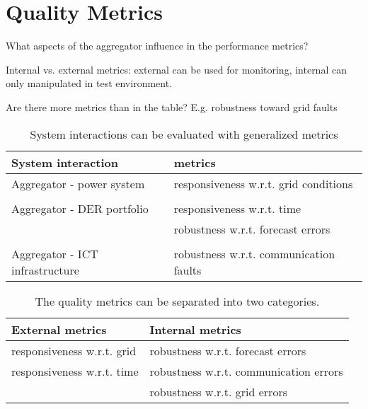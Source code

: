 \section{Quality Metrics}

What aspects of the aggregator influence in the performance metrics?

Internal vs. external metrics: external can be used for monitoring, internal can only manipulated in test environment.

Are there more metrics than in the table? E.g. robustness toward grid faults

\begin{table}[!t]%
\renewcommand{\arraystretch}{1.3}
\caption{System interactions can be evaluated with generalized metrics}
\label{tab:metrics}
\centering
\begin{tabular}{ll}
\toprule
System interaction & metrics\\
\midrule
Aggregator - power system & responsiveness w.r.t. grid conditions\\
\\
Aggregator - DER portfolio & responsiveness w.r.t. time\\
 & robustness w.r.t. forecast errors\\
 \\
Aggregator -  ICT infrastructure & robustness w.r.t. communication faults\\
\bottomrule
\end{tabular}
\end{table}

\begin{table}[!t]
\renewcommand{\arraystretch}{1.3}
\caption{The quality metrics can be separated into two categories.}
\label{tab:metricsclass}
\centering
\begin{tabular}{ll}
\toprule
External metrics & Internal metrics\\
\midrule
responsiveness w.r.t. grid &robustness w.r.t. forecast errors\\
responsiveness w.r.t. time & robustness w.r.t. communication errors\\
& robustness w.r.t. grid errors\\
\bottomrule
\end{tabular}
\end{table}
